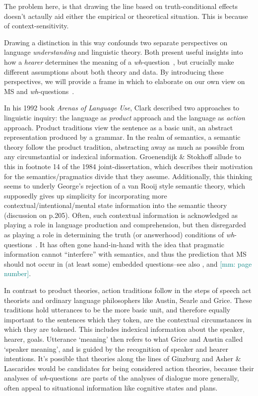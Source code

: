 \documentclass[12pt,letterpaper,table,svgnames,dvipsnames]{article}
\newcommand{\mm}[1]{\textcolor{teal}{[mm: #1]}}
\newcommand{\whq}{\emph{wh}-question~}
\newcommand{\whqs}{\emph{wh}-questions~}
\begin{document}
The problem here, is that drawing the line based on truth-conditional effects doesn't actaully aid either the empirical or theoretical situation. This is because of context-sensitivity.




Drawing a distinction in this way confounds two separate perspectives on language \emph{understanding} and linguistic theory. Both present useful insights into how a \emph{hearer} determines the meaning of a \whq, but crucially make different assumptions about both theory and data. By introducing these perspectives, we will provide a frame in which to elaborate on our own view on MS and \whqs.

In his 1992 book \emph{Arenas of Language Use}, Clark described two approaches to linguistic inquiry: the language as \emph{product} approach and the language as \emph{action} approach. Product traditions view the sentence as a basic unit, an abstract representation produced by a grammar. In the realm of semantics, a semantic theory follow the product tradition, abstracting away as much as possible from any circumstantial or indexical information. Groenendijk \& Stokhoff allude to this in footnote 14 of the 1984 joint-dissertation, which describes their motivation for the semantics/pragmatics divide that they assume. Additionally, this thinking seems to underly George's rejection of a van Rooij style semantic theory, which supposedly gives up simplicity for incorporating more contextual/intentional/mental state information into the semantic theory (discussion on p.205). Often, such contextual information is acknowledged as playing a role in language production and comprehension, but then disregarded as playing a role in determining the truth (or answerhood) conditions of \whqs. It has often gone hand-in-hand with the idea that pragmatic information cannot ``interfere'' with semantics, and thus the prediction that MS should not occur in (at least some) embedded questions--see also , and \cite{xiang2016}\mm{page number}.


In contrast to product theories, action traditions follow in the steps of speech act theorists and ordinary language philosophers like Austin, Searle and Grice. These traditions hold utterances to be the more basic unit, and therefore equally important to the sentences which they token, are the contextual circumstances in which they are tokened. This includes indexical information about the speaker, hearer, goals. Utterance `meaning' then refers to what Grice and Austin called `speaker meaning', and is guided by the recognition of speaker and hearer intentions. It's possible that theories along the lines of Ginzburg and Asher \& Lascarides would be candidates for being considered action theories, because their analyses of \whqs are parts of the analyses of dialogue more generally, often appeal to situational information like cognitive states and plans. 
\end{document}
